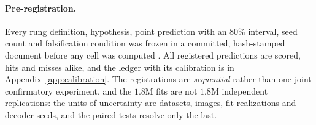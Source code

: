 \paragraph{Pre-registration.} Every rung definition, hypothesis, point prediction with an $80\%$
interval, seed count and falsification condition was frozen in a committed, hash-stamped document
before any cell was computed \citep{munafo2017manifesto,nosek2018preregistration}. All registered
predictions are scored, hits and misses alike, and the ledger with its calibration is in
Appendix~\ref{app:calibration}. The registrations are \emph{sequential} rather than one joint
confirmatory experiment, and the $1.8$M fits are not $1.8$M independent replications: the units of
uncertainty are datasets, images, fit realizations and decoder seeds, and the paired tests resolve
only the last.
